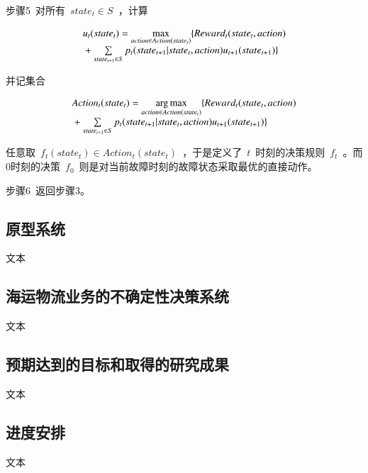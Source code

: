 步骤5~对所有~$state_t \in S$~，计算

\begin{equation}\label{equation:backward_mdp}
\begin{array}{l}
{u_t}(stat{e_t}) = \mathop {\max }\limits_{action \in Action(stat{e_t})} \{ Rewar{d_t}(stat{e_t},action)\\
{\rm{                        }} + \sum\limits_{stat{e_{t + 1}} \in S} {{p_t}(stat{e_{t + 1}}|stat{e_t},action){u_{t + 1}}(stat{e_{t + 1}})} \} 
\end{array}
\end{equation}

并记集合

\begin{equation}\label{equation:backward_mdp_arg}
\begin{array}{l}
Actio{n_t}(stat{e_t}) = \mathop {\arg \max }\limits_{action \in Action(stat{e_t})} \{ Rewar{d_t}(stat{e_t},action)\\
{\rm{                       }} + \sum\limits_{stat{e_{t + 1}} \in S} {{p_t}(stat{e_{t + 1}}|stat{e_t},action){u_{t + 1}}(stat{e_{t + 1}})} \} 
\end{array}
\end{equation}

任意取~$f_t(state_t) \in Action_t(state_t)$~，于是定义了~$t$~时刻的决策规则~$f_t$~。而0时刻的决策~$f_0$~则是对当前故障时刻的故障状态采取最优的直接动作。

步骤6~返回步骤3。


\subsection{原型系统}
文本

\subsection{海运物流业务的不确定性决策系统}
文本


\subsection{预期达到的目标和取得的研究成果}
文本

\subsection{进度安排}
文本

